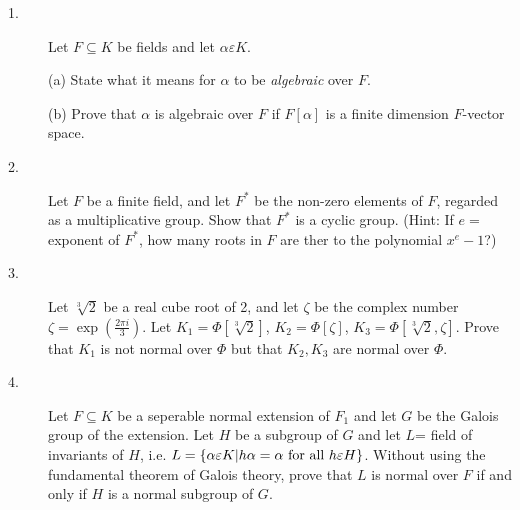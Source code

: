 \documentclass{article}
\begin{document}
\begin{description}
\item[1.]
Let $F \subseteq K$ be fields and let $\alpha \varepsilon K$.

\item[\quad] (a)
State what it means for $\alpha$ to be {\it algebraic} over $F$.

\item[\quad] (b)
Prove that $\alpha$ is algebraic over $F$ if $F[\alpha]$ is a finite
dimension $F$-vector space.

\item[2.]
Let $F$ be a finite field, and let $F^\ast$ be the non-zero elements of $F$,
regarded as a multiplicative group. Show that $F^\ast$ is a cyclic group.
(Hint: If $e =$ exponent of $F^\ast$, how many roots in $F$ are ther to the
polynomial $x^e - 1$?)

\item[3.]
Let $\sqrt[3]{2}$ be a real cube root of 2, and let $\zeta$ be the complex
number $\zeta = \exp \left(\frac{2 \pi i}{3} \right)$. Let
$K_1 = \Phi \left[ \sqrt[3]{2} \right]$, $K_2 = \Phi[\zeta]$,
$K_3 = \Phi \left[\sqrt[3]{2}, \zeta \right]$. Prove that $K_1$ is not normal
over $\Phi$ but that $K_2, K_3$ are normal over $\Phi$.

\item[4.]
Let $F \subseteq K$ be a seperable normal extension of $F_1$ and let $G$ be
the Galois group of the extension. Let $H$ be a subgroup of $G$ and let
$L$= field of invariants of $H$, i.e.
$L = \{ \alpha \varepsilon K|h\alpha = \alpha
\hbox{\ for} \hbox{\ all\ } h \varepsilon H \}$. Without using the
fundamental theorem of Galois theory, prove that $L$ is normal over
$F$ if and only if $H$ is a normal subgroup of $G$.





\end{description}    
\end{document}
